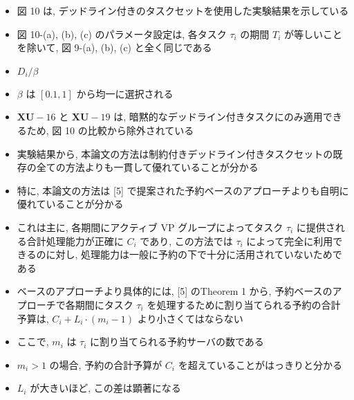 \begin{frame}{}
    \begin{itemize}
        \item 図 10 は, デッドライン付きのタスクセットを使用した実験結果を示している
\item 図 10-(a), (b), (c) のパラメータ設定は, 各タスク $\tau_{i}$ の期間 $T_{i}$ が等しいことを除いて, 図 9-(a), (b), (c) と全く同じである
\item $D_{i} / \beta$ 
\item $\beta$ は $[0.1,1]$ から均一に選択される
\item $\mathbf{X U}-16$ と $\mathbf{X U}-19$ は, 暗黙的なデッドライン付きタスクにのみ適用できるため, 図 10 の比較から除外されている
\item 実験結果から, 本論文の方法は制約付きデッドライン付きタスクセットの既存の全ての方法よりも一貫して優れていることが分かる
    \end{itemize}
\end{frame}

\begin{frame}{}
    \begin{itemize}
        \item 特に, 本論文の方法は [5] で提案された予約ベースのアプローチよりも自明に優れていることが分かる
\item これは主に, 各期間にアクティブ VP グループによってタスク $\tau_{i}$ に提供される合計処理能力が正確に $C_{i}$ であり, この方法では $\tau_{i}$ によって完全に利用できるのに対し, 処理能力は一般に予約の下で十分に活用されていないためである
\item ベースのアプローチより具体的には, [5] のTheorem 1 から, 予約ベースのアプローチで各期間にタスク $\tau_{i}$ を処理するために割り当てられる予約の合計予算は, $C_{i}+L_{i} \cdot\left(m_{i}-1\right)$ より小さくてはならない
\item ここで, $m_{i}$ は $\tau_{i}$ に割り当てられる予約サーバの数である
\item $m_{i}>1$ の場合, 予約の合計予算が $C_{i}$ を超えていることがはっきりと分かる
\item $L_{i}$ が大きいほど, この差は顕著になる
    \end{itemize}
\end{frame}
